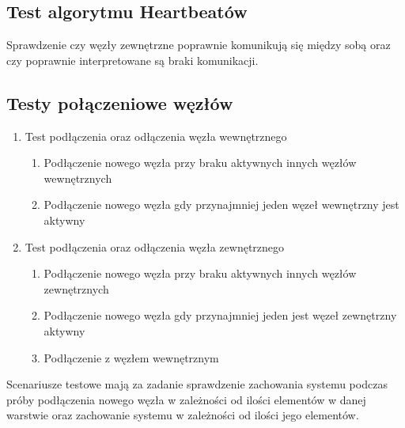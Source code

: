 \subsection*[Test algorytmu Heartbeatów]{Test algorytmu Heartbeatów}
Sprawdzenie czy węzły zewnętrzne poprawnie komunikują się między sobą oraz czy poprawnie interpretowane są braki komunikacji.

\subsection*[Testy połączeniowe węzłów]{Testy połączeniowe węzłów}
\begin{enumerate}
\item Test podłączenia oraz odłączenia węzła wewnętrznego
\begin{enumerate}
\item Podłączenie nowego węzła przy braku aktywnych innych węzłów wewnętrznych
\item Podłączenie nowego węzła gdy przynajmniej jeden węzeł wewnętrzny jest aktywny 
\end{enumerate}

\item Test podłączenia oraz odłączenia węzła zewnętrznego
\begin{enumerate}
\item Podłączenie nowego węzła przy braku aktywnych innych węzłów zewnętrznych
\item Podłączenie nowego węzła gdy przynajmniej jeden jest węzeł zewnętrzny aktywny
\item Podłączenie z węzłem wewnętrznym

\end{enumerate}
\end{enumerate}

Scenariusze testowe mają za zadanie sprawdzenie zachowania systemu podczas próby podłączenia nowego węzła w zależności od ilości elementów w danej warstwie oraz zachowanie systemu w zależności od ilości jego elementów.
